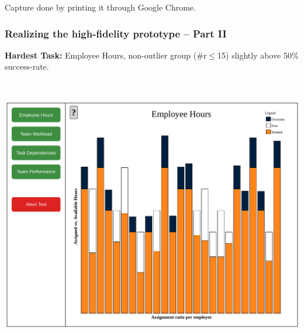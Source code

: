 \documentclass[xcolor=svgnames,10pt,aspectratio=1610]{beamer}
\begin{document}
\begin{frame}
\begin{minipage}{\textwidth}
\begin{minipage}{\textwidth}
\begin{minipage}{0.48\textwidth}
      \end{minipage}
    \end{minipage}
  \end{minipage}
  Capture done by printing it through Google Chrome.
\end{frame}

\begin{frame}
  \frametitle{Realizing the high-fidelity prototype -- Part II}
  \vspace{-1cm}
  \begin{minipage}{\textwidth}
    \textbf{Hardest Task:} Employee Hours, non-outlier group (\#r$\leq$15) slightly
    above 50\% success-rate.
  \end{minipage} \\
  \begin{minipage}{\textwidth}
    \begin{minipage}{\textwidth}
      \begin{minipage}{0.49\textwidth}
        \includegraphics[width=\textwidth]{../msccls/figures/captures/webapp_employee_hours_task.pdf}
      \end{minipage}
      \begin{minipage}{0.49\textwidth}

\end{minipage}
\end{minipage}
\end{minipage}
\end{frame}
\end{document}
